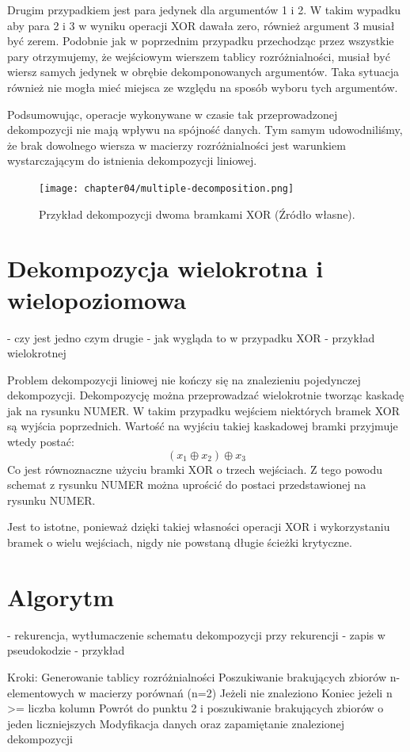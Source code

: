 Drugim przypadkiem jest para jedynek dla argumentów 1 i 2.
W takim wypadku aby para 2 i 3 w wyniku operacji XOR dawała zero,
również argument 3 musiał być zerem.
Podobnie jak w poprzednim przypadku przechodząc przez wszystkie pary otrzymujemy,
że wejściowym wierszem tablicy rozróżnialności,
musiał być wiersz samych jedynek w obrębie dekomponowanych argumentów.
Taka sytuacja również nie mogła mieć miejsca ze względu na sposób wyboru tych argumentów.

Podsumowując,
operacje wykonywane w czasie tak przeprowadzonej dekompozycji nie mają wpływu na spójność danych.
Tym samym udowodniliśmy,
że brak dowolnego wiersza w macierzy rozróżnialności jest warunkiem wystarczającym do istnienia dekompozycji liniowej.

\begin{figure}[H]
\centering
\texttt{[image: chapter04/multiple-decomposition.png]}
\caption{Przykład dekompozycji dwoma bramkami XOR (Źródło własne).}
\label{fig:xor}
\end{figure}

\section{Dekompozycja wielokrotna i wielopoziomowa}
	- czy jest jedno czym drugie
	- jak wygląda to w przypadku XOR
	- przykład wielokrotnej

Problem dekompozycji liniowej nie kończy się na znalezieniu pojedynczej dekompozycji.
Dekompozycję można przeprowadzać wielokrotnie tworząc kaskadę jak na rysunku NUMER.
W takim przypadku wejściem niektórych bramek XOR są wyjścia poprzednich.
Wartość na wyjściu takiej kaskadowej bramki przyjmuje wtedy postać:
\begin{equation}
(x_1 \oplus x_2) \oplus x_3
\end{equation}
Co jest równoznaczne użyciu bramki XOR o trzech wejściach.
Z tego powodu schemat z rysunku NUMER można uprościć do postaci przedstawionej na rysunku NUMER.

Jest to istotne,
ponieważ dzięki takiej własności operacji XOR i wykorzystaniu bramek o wielu wejściach,
nigdy nie powstaną długie ścieżki krytyczne.

\section{Algorytm}
- rekurencja, wytłumaczenie schematu dekompozycji przy rekurencji
- zapis w pseudokodzie
- przykład

Kroki:
Generowanie tablicy rozróżnialności
Poszukiwanie brakujących zbiorów n-elementowych w macierzy porównań (n=2)
Jeżeli nie znaleziono
Koniec jeżeli n >= liczba kolumn
Powrót do punktu 2 i poszukiwanie brakujących zbiorów o jeden liczniejszych
Modyfikacja danych oraz zapamiętanie znalezionej dekompozycji
